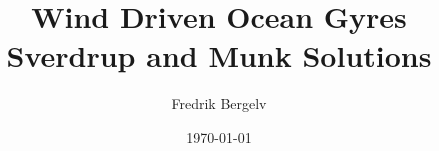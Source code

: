 
\title{Wind Driven Ocean Gyres \\ Sverdrup and Munk Solutions}

\subtitle{}

\author{Fredrik Bergelv}

\date{\today}

\newcommand{\IncludeBib}{n} 
